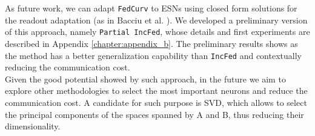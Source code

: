 As future work, we can adapt \texttt{FedCurv} to ESNs using closed form solutions for the readout adaptation (as in Bacciu et al. \cite{bacciu2021federated}). We developed a preliminary version of this approach, namely \texttt{Partial IncFed}, whose details and first experiments are described in Appendix \ref{chapter:appendix_b}. The preliminary results shows as the method has a better generalization capability than \texttt{IncFed} and contextually reducing the communication cost.\\

Given the good potential showed by such approach, in the future we aim to explore other methodologies to select the most important neurons and reduce the communication cost. A candidate for such purpose is SVD, which allows to select the principal components of the spaces spanned by A and B, thus reducing their dimensionality.